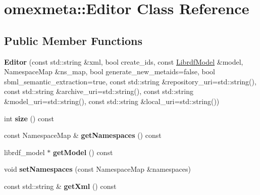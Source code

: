 \hypertarget{classomexmeta_1_1Editor}{}\section{omexmeta\+:\+:Editor Class Reference}
\label{classomexmeta_1_1Editor}
\subsection*{Public Member Functions}
\begin{DoxyCompactItemize}
\item 
\mbox{\label{classomexmeta_1_1Editor_a6ac976c1a3762f77a577b5735cd509f4}} 
{\bfseries Editor} (const std\+::string \&xml, bool create\+\_\+ids, const \hyperlink{classredland_1_1LibrdfModel}{Librdf\+Model} \&model, Namespace\+Map \&ns\+\_\+map, bool generate\+\_\+new\+\_\+metaids=false, bool sbml\+\_\+semantic\+\_\+extraction=true, const std\+::string \&repository\+\_\+uri=std\+::string(), const std\+::string \&archive\+\_\+uri=std\+::string(), const std\+::string \&model\+\_\+uri=std\+::string(), const std\+::string \&local\+\_\+uri=std\+::string())
\item 
\mbox{\label{classomexmeta_1_1Editor_ab5b39f1f137312ce77575e73a86dfb05}} 
int {\bfseries size} () const
\item 
\mbox{\label{classomexmeta_1_1Editor_a514443fe99a6e52154d1fe4f7ec94618}} 
const Namespace\+Map \& {\bfseries get\+Namespaces} () const
\item 
\mbox{\label{classomexmeta_1_1Editor_a4b2610fb802eb306349d69ae6fde60c0}} 
librdf\+\_\+model $\ast$ {\bfseries get\+Model} () const
\item 
\mbox{\label{classomexmeta_1_1Editor_a83836e19bb1de9c7df69d36e8b61b2b2}} 
void {\bfseries set\+Namespaces} (const Namespace\+Map \&namespaces)
\item 
\mbox{\label{classomexmeta_1_1Editor_ad931e829fc9f78717e0c1443c619b7d3}} 
const std\+::string \& {\bfseries get\+Xml} () const
\item 
\mbox{\label{classomexmeta_1_1Editor_a242c86222e1aeff337d3af22641db1de}} 

\end{DoxyCompactItemize}
